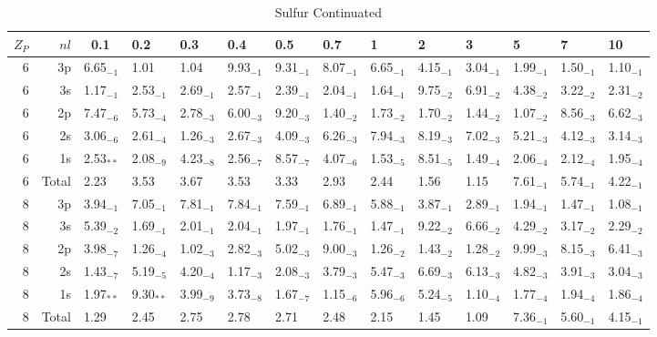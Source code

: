 \documentclass[preprint,showpacs,pra]{revtex4}
\begin{document}
\begin{table}[htbp]
\caption{Sulfur Continuated}%
\begin{tabular}{|r|r|llllllllllll|}
\hline
$Z_P$ & $nl$ & \ 0.1 & 0.2 & 0.3 & 0.4 & 0.5 & 0.7 & 1 & 2 & 3 & 5 & 7 & 10
\\ \hline
6 & 3p & 6.65$_{-1}$ & 1.01$_{ }$ & 1.04$_{ }$ & 9.93$_{-1}$ & 9.31$_{-1}$ & 
8.07$_{-1}$ & 6.65$_{-1}$ & 4.15$_{-1}$ & 3.04$_{-1}$ & 1.99$_{-1}$ & 1.50$%
_{-1}$ & 1.10$_{-1}$ \\ 
6 & 3s & 1.17$_{-1}$ & 2.53$_{-1}$ & 2.69$_{-1}$ & 2.57$_{-1}$ & 2.39$_{-1}$
& 2.04$_{-1}$ & 1.64$_{-1}$ & 9.75$_{-2}$ & 6.91$_{-2}$ & 4.38$_{-2}$ & 3.22$%
_{-2}$ & 2.31$_{-2}$ \\ 
6 & 2p & 7.47$_{-6}$ & 5.73$_{-4}$ & 2.78$_{-3}$ & 6.00$_{-3}$ & 9.20$_{-3}$
& 1.40$_{-2}$ & 1.73$_{-2}$ & 1.70$_{-2}$ & 1.44$_{-2}$ & 1.07$_{-2}$ & 8.56$%
_{-3}$ & 6.62$_{-3}$ \\ 
6 & 2s & 3.06$_{-6}$ & 2.61$_{-4}$ & 1.26$_{-3}$ & 2.67$_{-3}$ & 4.09$_{-3}$
& 6.26$_{-3}$ & 7.94$_{-3}$ & 8.19$_{-3}$ & 7.02$_{-3}$ & 5.21$_{-3}$ & 4.12$%
_{-3}$ & 3.14$_{-3}$ \\ 
6 & 1s & 2.53$_{**}$ & 2.08$_{-9}$ & 4.23$_{-8}$ & 2.56$_{-7}$ & 8.57$_{-7}$
& 4.07$_{-6}$ & 1.53$_{-5}$ & 8.51$_{-5}$ & 1.49$_{-4}$ & 2.06$_{-4}$ & 2.12$%
_{-4}$ & 1.95$_{-4}$ \\ 
6 & Total & 2.23$_{ }$ & 3.53$_{ }$ & 3.67$_{ }$ & 3.53$_{ }$ & 3.33$_{ }$ & 
2.93$_{ }$ & 2.44$_{ }$ & 1.56$_{ }$ & 1.15$_{ }$ & 7.61$_{-1}$ & 5.74$_{-1}$
& 4.22$_{-1}$ \\ \hline
8 & 3p & 3.94$_{-1}$ & 7.05$_{-1}$ & 7.81$_{-1}$ & 7.84$_{-1}$ & 7.59$_{-1}$
& 6.89$_{-1}$ & 5.88$_{-1}$ & 3.87$_{-1}$ & 2.89$_{-1}$ & 1.94$_{-1}$ & 1.47$%
_{-1}$ & 1.08$_{-1}$ \\ 
8 & 3s & 5.39$_{-2}$ & 1.69$_{-1}$ & 2.01$_{-1}$ & 2.04$_{-1}$ & 1.97$_{-1}$
& 1.76$_{-1}$ & 1.47$_{-1}$ & 9.22$_{-2}$ & 6.66$_{-2}$ & 4.29$_{-2}$ & 3.17$%
_{-2}$ & 2.29$_{-2}$ \\ 
8 & 2p & 3.98$_{-7}$ & 1.26$_{-4}$ & 1.02$_{-3}$ & 2.82$_{-3}$ & 5.02$_{-3}$
& 9.00$_{-3}$ & 1.26$_{-2}$ & 1.43$_{-2}$ & 1.28$_{-2}$ & 9.99$_{-3}$ & 8.15$%
_{-3}$ & 6.41$_{-3}$ \\ 
8 & 2s & 1.43$_{-7}$ & 5.19$_{-5}$ & 4.20$_{-4}$ & 1.17$_{-3}$ & 2.08$_{-3}$
& 3.79$_{-3}$ & 5.47$_{-3}$ & 6.69$_{-3}$ & 6.13$_{-3}$ & 4.82$_{-3}$ & 3.91$%
_{-3}$ & 3.04$_{-3}$ \\ 
8 & 1s & 1.97$_{**}$ & 9.30$_{**}$ & 3.99$_{-9}$ & 3.73$_{-8}$ & 1.67$_{-7}$
& 1.15$_{-6}$ & 5.96$_{-6}$ & 5.24$_{-5}$ & 1.10$_{-4}$ & 1.77$_{-4}$ & 1.94$%
_{-4}$ & 1.86$_{-4}$ \\ 
8 & Total & 1.29$_{ }$ & 2.45$_{ }$ & 2.75$_{ }$ & 2.78$_{ }$ & 2.71$_{ }$ & 
2.48$_{ }$ & 2.15$_{ }$ & 1.45$_{ }$ & 1.09$_{ }$ & 7.36$_{-1}$ & 5.60$_{-1}$
& 4.15$_{-1}$ \\ \hline\hline
\end{tabular}%
\end{table}
\end{document}
